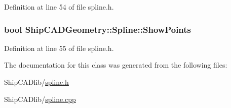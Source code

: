 Definition at line 54 of file spline.\-h.

\hypertarget{classShipCADGeometry_1_1Spline_a7e14387674284ab28e1a0e725c5c5b0e}{
\subsubsection[{Show\-Points}]{\setlength{\rightskip}{0pt plus 5cm}bool Ship\-C\-A\-D\-Geometry\-::\-Spline\-::\-Show\-Points}}\label{classShipCADGeometry_1_1Spline_a7e14387674284ab28e1a0e725c5c5b0e}


Definition at line 55 of file spline.\-h.



The documentation for this class was generated from the following files\-:\begin{DoxyCompactItemize}
\item 
Ship\-C\-A\-Dlib/\hyperlink{spline_8h}{spline.\-h}\item 
Ship\-C\-A\-Dlib/\hyperlink{spline_8cpp}{spline.\-cpp}\end{DoxyCompactItemize}
